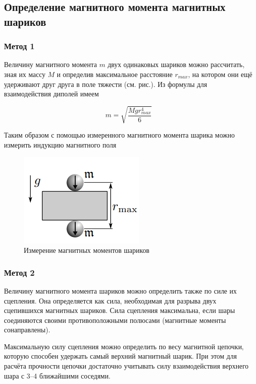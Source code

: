 \subsection{Определение магнитного момента магнитных шариков}

\subsubsection{Метод 1}

Величину магнитного момента $m$ двух одинаковых шариков можно рассчитать, зная их массу $M$ и определив максимальное расстояние $r_{max}$, на котором они ещё удерживают друг друга в поле тяжести (см. рис.). Из формулы для взаимодействия диполей имеем

\begin{equation}
    m = \sqrt{\frac{Mgr^4_{max}}{6}}
\end{equation}

Таким образом с помощью измеренного магнитного момента шарика можно измерить индукцию магнитного поля

\begin{figure}[h]
    \centering
    \includegraphics[width = 5 cm]{images/1.png}
    \caption{Измерение магнитных моментов шариков}
    \label{msh1}
\end{figure}

\subsubsection{Метод 2}

Величину магнитного момента шариков можно определить также по силе их сцепления. Она определяется как сила, необходимая для разрыва двух сцепившихся магнитных шариков. Сила сцепления максимальна, если шары соединяются своими противоположными полюсами (магнитные моменты сонаправлены). 

Максимальную силу сцепления можно определить по весу магнитной цепочки, которую способен удержать самый верхний магнитный шарик. При этом для расчёта прочности цепочки достаточно учитывать силу взаимодействия верхнего шара с 3–4 ближайшими соседями.

